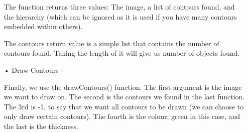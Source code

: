 \documentclass[14pt,a4paper]{article}
\begin{document}
\begin{enumerate}
\par The function returns three values: The image, a list of contours found, and the hierarchy (which can be ignored as it is used if you have many contours embedded within others).
\par The contours return value is a simple list that contains the number of contours found. Taking the length of it will give us number of objects found.
\item[•] Draw Contours - 
\par Finally, we use the drawContours() function. The first argument is the image we want to draw on. The second is the contours we found in the last function. The 3rd is -1, to say that we want all contours to be drawn (we can choose to only draw certain contours). The fourth is the colour, green in this case, and the last is the thickness.
\end{enumerate}
\end{document}
